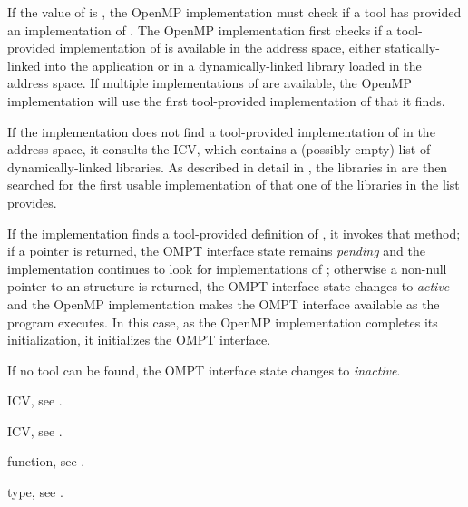 If the value of  is , the OpenMP implementation 
must check if a tool has provided an implementation of . 
The OpenMP implementation first checks if a tool-provided implementation of 
 is available in the address space, either 
statically-linked into the application or in a dynamically-linked library 
loaded in the address space. If multiple implementations of 
 are available, the OpenMP implementation will use 
the first tool-provided implementation of  that it finds.

If the implementation does not find a tool-provided implementation of 
 in the address space, it consults the 
 ICV, which contains a (possibly empty) list of 
dynamically-linked libraries. As  described in detail in 
, the libraries in  
are then searched for the first usable implementation of 
 that one of the libraries in the list provides.

If the implementation finds a tool-provided definition of 
, it invokes that method; if a  pointer 
is returned, the OMPT interface state remains \emph{pending} and the 
implementation continues to look for implementations of ;
otherwise a non-null pointer to an  
structure is returned, the OMPT interface state changes to \emph{active} 
and the OpenMP implementation makes the OMPT interface available as the 
program executes. In this case, as the OpenMP implementation completes its 
initialization, it initializes the OMPT interface.

If no tool can be found, the OMPT interface state changes to \emph{inactive}.

\begin{crossrefs}
\item {} ICV, 
see .

\item {} ICV, see .

\item {} function, see .

\item {} type, 
see .
\end{crossrefs}

